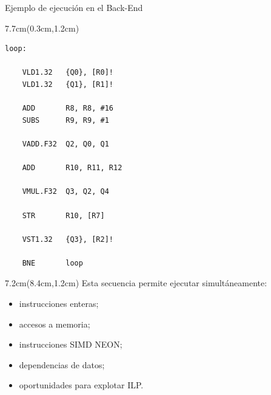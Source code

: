 \begin{frame}[fragile]{Ejemplo de ejecución en el Back-End}
 \begin{textblock*}{7.7cm}(0.3cm,1.2cm)
  \begin{lstlisting}[basicstyle=\scriptsize,numbers=none, escapechar=\@]
loop:

    VLD1.32   {Q0}, [R0]!
    VLD1.32   {Q1}, [R1]!

    ADD       R8, R8, #16
    SUBS      R9, R9, #1

    VADD.F32  Q2, Q0, Q1

    ADD       R10, R11, R12

    VMUL.F32  Q3, Q2, Q4

    STR       R10, [R7]

    VST1.32   {Q3}, [R2]!

    BNE       loop
  \end{lstlisting}
 \end{textblock*}
 \begin{textblock*}{7.2cm}(8.4cm,1.2cm)
  \justifying Esta secuencia permite ejecutar simultáneamente:
  \begin{itemize}[<+(1)->] \justifying
   \item instrucciones enteras;
   \item accesos a memoria;
   \item instrucciones SIMD NEON;
   \item dependencias de datos;
   \item oportunidades para explotar ILP.
  \end{itemize}
 \end{textblock*}
\end{frame}

